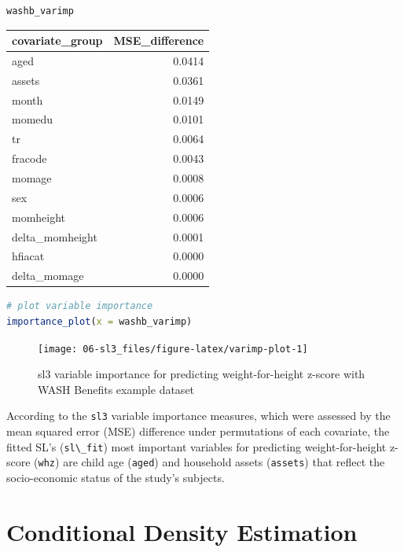 \documentclass[
  12pt, krantz2,
]{krantz}
\newcommand{\passthrough}[1]{#1}
\newcommand{\1}{\mathbbm{1}}
\theoremstyle{definition}
\theoremstyle{definition}
\theoremstyle{definition}
\theoremstyle{definition}
\theoremstyle{remark}
\begin{document}
\begin{lstlisting}[language=R]
washb_varimp
\end{lstlisting}

\begin{tabular}{l|r}
\hline
covariate\_group & MSE\_difference\\
\hline
aged & 0.0414\\
\hline
assets & 0.0361\\
\hline
month & 0.0149\\
\hline
momedu & 0.0101\\
\hline
tr & 0.0064\\
\hline
fracode & 0.0043\\
\hline
momage & 0.0008\\
\hline
sex & 0.0006\\
\hline
momheight & 0.0006\\
\hline
delta\_momheight & 0.0001\\
\hline
hfiacat & 0.0000\\
\hline
delta\_momage & 0.0000\\
\hline
\end{tabular}

\begin{lstlisting}[language=R]
# plot variable importance
importance_plot(x = washb_varimp)
\end{lstlisting}

\begin{figure}

{\centering \texttt{[image: 06-sl3\_files/figure-latex/varimp-plot-1]} 

}

\caption{sl3 variable importance for predicting weight-for-height z-score with WASH Benefits example dataset}\label{fig:varimp-plot}
\end{figure}

According to the \passthrough{\lstinline!sl3!} variable importance measures, which were assessed by the
mean squared error (MSE) difference under permutations of each covariate, the
fitted SL's (\passthrough{\lstinline!sl\_fit!}) most important variables for predicting weight-for-height
z-score (\passthrough{\lstinline!whz!}) are child age (\passthrough{\lstinline!aged!}) and household assets (\passthrough{\lstinline!assets!}) that
reflect the socio-economic status of the study's subjects.

\hypertarget{conditional-density-estimation}{%
\section{Conditional Density Estimation}\label{conditional-density-estimation}}
\end{document}
